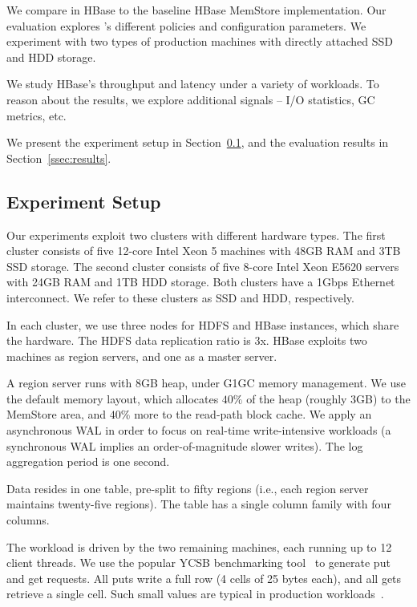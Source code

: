 We compare \sys\/ in HBase to the baseline HBase MemStore implementation.  
Our evaluation explores \sys's different policies and configuration parameters.  
We experiment with two types of production machines with directly attached SSD 
and HDD storage. 

We study HBase's throughput and latency under a variety of workloads. 
To reason about the results, we explore additional signals -- I/O statistics, 
GC metrics, etc.  

We present the experiment setup in Section~\ref{ssec:setup}, and the evaluation 
results in Section~\ref{ssec:results}. 

\subsection{Experiment Setup}
\label{ssec:setup}

Our experiments exploit two clusters with different hardware types. The first cluster consists of five 12-core Intel Xeon 5 
machines with 48GB RAM and 3TB SSD storage. The second cluster consists of five 8-core Intel Xeon E5620 servers 
with 24GB RAM and 1TB HDD storage. Both clusters have a 1Gbps Ethernet interconnect. We refer to these clusters as
SSD and HDD, respectively.

In each cluster, we use three nodes for HDFS and HBase instances, which share the hardware. The HDFS data 
replication ratio is 3x. HBase exploits two machines as region servers, and one as a master server. 

A region server runs  with 8GB heap, under G1GC memory management. 
We use the default memory layout,  which allocates $40\%$ of the heap (roughly 3GB) to the MemStore 
area, and $40\%$ more to the read-path block cache. We apply an asynchronous WAL in order to focus on real-time 
write-intensive workloads (a synchronous WAL implies an order-of-magnitude slower writes). The log aggregation
period is one second. 

Data resides in one table, pre-split to fifty regions (i.e., each region server maintains twenty-five regions). 
The table has a single column family with four columns. 

The workload is driven by the two remaining machines, each running up to 12 client threads. 
We use the popular YCSB benchmarking tool~\cite{Cooper:2010:BCS:1807128.1807152} to generate 
put and get requests. All puts write a full row (4 cells of 25 bytes each), and all gets retrieve
a single cell. Such small values are typical in production workloads~\cite{Wu2015}. 

